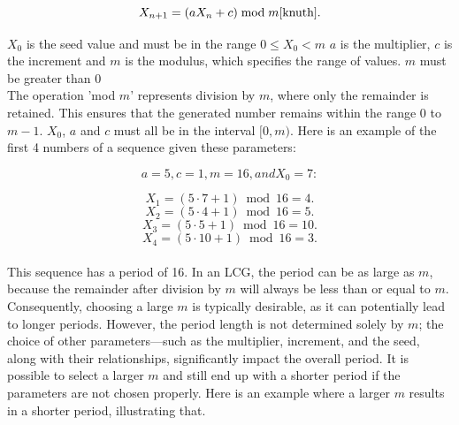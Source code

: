 \begin{equation}
X_{n+1} = (aX_n + c) \bmod m \cite{knuth}.
\end{equation}

\noindent $X_0$ is the seed value and must be in the range $0 \leq X_0 < m$ \newline
$a$ is the multiplier,\newline 
$c$ is the increment and \newline
$m$ is the modulus, which specifies the range of values. $m$ must be greater than 0 \newline
\\
\noindent The operation 'mod $m$' represents division by $m$, where only the remainder
is retained. This ensures that the generated number remains within the range
0 to $m-1$.  $X_0$, $a$ and $c$ must all be in the interval $[0, m)$. 
Here is an example of the first 4 numbers of a sequence given these parameters: \newline

\begin{equation}
	a = 5, c = 1, m = 16, and X_0 = 7:
\end{equation}

\begin{equation}
	 X_1 = (5 \cdot 7 + 1)\bmod 16 = 4.
\end{equation}
\begin{equation} 
	X_2 = (5 \cdot 4 + 1) \bmod 16 = 5. 
\end{equation}
\begin{equation} X_3 = (5 \cdot 5 + 1) \bmod 16 = 10. \end{equation}
\begin{equation} X_4 = (5 \cdot 10 + 1) \bmod 16 = 3. \end{equation}
\\
\noindent This sequence has a period of 16. In an LCG, the period can be as large as $m$,
because the remainder after division by $m$ will always be less than or equal to
$m$. Consequently, choosing a large $m$ is typically desirable, as it can potentially
lead to longer periods. However, the period length is not determined solely by
$m$; the choice of other parameters—such as the multiplier, increment, and the
seed, along with their relationships, significantly impact the overall period. It
is possible to select a larger $m$ and still end up with a shorter period if the parameters are not chosen properly. Here is an example where a larger $m$ results in a shorter period, illustrating that.

